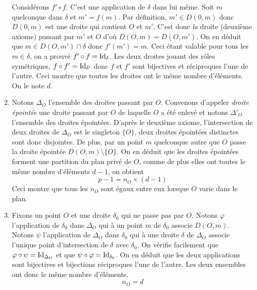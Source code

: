 \begin{enumerate}
Considérons $f'\circ f$. C'est une application de $\delta$ dans lui même. Soit $m$ quelconque dans $\delta$ et $m'=f(m)$. Par définition, $m'\in D(0,m)$ donc $D(0,m)$ est une droite qui contient $O$ et $m'$. C'est donc \emph{la} droite (deuxième axiome) passant par $m'$ et $O$ d'où $D(O,m)=D(O,m')$. On en déduit que $m\in D(O,m')\cap \delta$ donc $f'(m')=m$. Ceci étant valable pour tous les $m\in \delta$, on a prouvé $f'\circ f =\operatorname{Id}_{\delta}$. Les deux droites jouant des rôles symétriques, $f\circ f' =\operatorname{Id}_{\delta'}$ donc $f$ et $f'$ sont bijectives et réciproques l'une de l'autre. Ceci montre que toutes les droites ont le même nombre d'éléments. On le note $d$.
 
 \item Notons $\Delta_O$ l'ensemble des droites passant par $O$. Convenons d'appeler \emph{droite épointée} une droite passant par $O$ de laquelle $O$ a été enlevé et notons $\Delta'_O$ l'ensemble des droites épointées. D'après le deuxième axiome, l'intersection de deux droites de $\Delta_O$ est le singleton $\{O\}$, deux droites épointées distinctes sont donc disjointes. De plus, par un point $m$ quelconque autre que $O$ passe la droite épointée $D(O,m)\setminus\{O\}$. On en déduit que les droites épointées forment une partition du plan privé de $O$, comme de plus elles ont toutes le même nombre d'éléments $d-1$, on obtient
\begin{displaymath}
 p-1 = n_O\times (d-1)
\end{displaymath}
Ceci montre que tous les $n_O$ sont égaux entre eux lorsque $O$ varie dans le plan.

 \item Fixons un point $O$ et une droite $\delta_0$ qui ne passe pas par $O$. Notons $\varphi$ l'application de $\delta_0$ dans $\Delta_O$ qui à un point $m$ de $\delta_0$ associe $D(O,m)$. Notons $\psi$ l'application de $\Delta_O$ dans $\delta_0$ qui à une droite $\delta$ de $\Delta_O$ associe l'unique point d'intersection de $\delta$ avec $\delta_0$. On vérifie facilement que $\varphi \circ \psi = \operatorname{Id}_{\Delta_O}$ et que $\psi \circ \varphi = \operatorname{Id}_{\delta_0}$. On en déduit que les deux applications sont bijectives et bijections réciproques l'une de l'autre. Les deux ensembles ont donc le même nombre d'éléments.
\begin{displaymath}
 n_O = d
\end{displaymath}


\end{enumerate}

